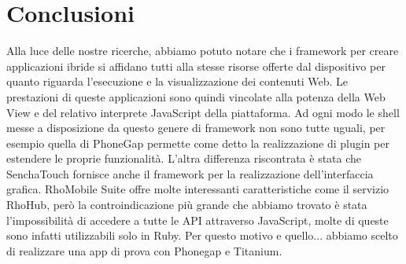 	
	\section{Conclusioni}
		Alla luce delle nostre ricerche, abbiamo potuto notare che i framework 
		per creare applicazioni ibride si affidano tutti alla stesse risorse offerte 
		dal dispositivo per quanto riguarda l'esecuzione e la visualizzazione 
		dei contenuti Web. Le prestazioni di queste applicazioni sono quindi vincolate 
		alla potenza della Web View e del relativo interprete JavaScript della 
		piattaforma. Ad ogni modo le shell messe a disposizione da questo genere 
		di framework non sono tutte uguali, per esempio quella di PhoneGap permette 
		come detto la realizzazione di plugin per estendere le proprie funzionalità. 
		L'altra differenza riscontrata è stata che SenchaTouch fornisce anche 
		il framework per la realizzazione dell'interfaccia grafica.
		RhoMobile Suite offre molte interessanti caratteristiche come il servizio 
		RhoHub, però la controindicazione più grande che abbiamo trovato è stata 
		l'impossibilità di accedere a tutte le API attraverso JavaScript, molte 
		di queste sono infatti utilizzabili solo in Ruby.
		Per questo motivo e quello... abbiamo scelto di realizzare una app di 
		prova con Phonegap e Titanium.

